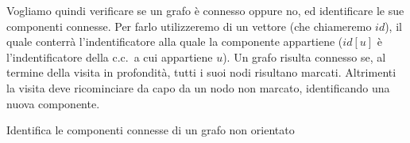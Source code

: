 
Vogliamo quindi verificare se un grafo è connesso oppure no, ed identificare le sue componenti connesse.
Per farlo utilizzeremo di un vettore (che chiameremo \(id\)), il quale conterrà l'indentificatore alla quale la componente appartiene (\(id[u]\) è l'indentificatore della c.c.\ a cui appartiene \(u\)).
Un grafo risulta connesso se, al termine della visita in profondità, tutti i suoi nodi risultano marcati.
Altrimenti la visita deve ricominciare da capo da un nodo non marcato, identificando una nuova componente.

\begin{algorithm}[H]
	\caption[Componenti Connesse]{Identifica le componenti connesse di un grafo non orientato}
	
	
\end{algorithm}

